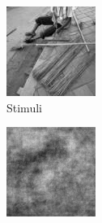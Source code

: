 \begin{figure}[H]
  \begin{subfigure}[t]{0.15\textwidth}
    \includegraphics[width=\linewidth]{img/ten-trials/stimulus_2.png}
    \caption{Stimuli}
  \end{subfigure}
  \begin{subfigure}[t]{0.15\textwidth}
    \includegraphics[width=\linewidth]{img/ten-trials/prediction_2_lr.png}

\end{subfigure}
\end{figure}
